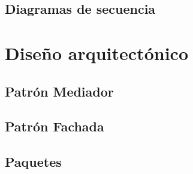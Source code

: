 \subsection{Diagramas de secuencia}



\section{Diseño arquitectónico}
\subsection{Patrón Mediador}

\subsection{Patrón Fachada}

\subsection{Paquetes}


